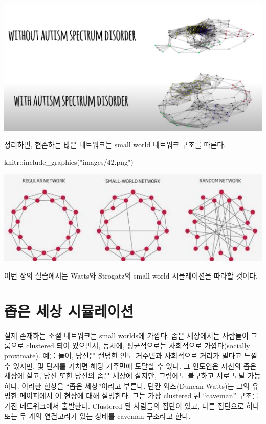 \documentclass[
]{book}
\newenvironment{Shaded}{\begin{snugshade}}{\end{snugshade}}
\newcommand{\FunctionTok}[1]{\textcolor[rgb]{0.00,0.00,0.00}{#1}}
\newcommand{\NormalTok}[1]{#1}
\newcommand{\SpecialCharTok}[1]{\textcolor[rgb]{0.00,0.00,0.00}{#1}}
\newcommand{\StringTok}[1]{\textcolor[rgb]{0.31,0.60,0.02}{#1}}
\begin{document}
\begin{center}\includegraphics[width=0.8\linewidth]{images/44} \end{center}

정리하면, 현존하는 많은 네트워크는 small world 네트워크 구조를 따른다.

\begin{Shaded}
\begin{Highlighting}[]
\NormalTok{knitr}\SpecialCharTok{::}\FunctionTok{include\_graphics}\NormalTok{(}\StringTok{"images/42.png"}\NormalTok{)}
\end{Highlighting}
\end{Shaded}

\begin{center}\includegraphics[width=0.8\linewidth]{images/42} \end{center}

이번 장의 실습에서는 Watts와 Strogatz의 small world 시뮬레이션을 따라할 것이다.

\hypertarget{uxc881uxc740-uxc138uxc0c1-uxc2dcuxbbacuxb808uxc774uxc158}{%
\section{좁은 세상 시뮬레이션}\label{uxc881uxc740-uxc138uxc0c1-uxc2dcuxbbacuxb808uxc774uxc158}}

실제 존재하는 소셜 네트워크는 small worlds에 가깝다. 좁은 세상에서는 사람들이 그룹으로 clustered 되어 있으면서, 동시에, 평균적으로는 사회적으로 가깝다(socially proximate). 예를 들어, 당신은 랜덤한 인도 거주민과 사회적으로 거리가 멀다고 느낄 수 있지만, 몇 단계를 거치면 해당 거주민에 도달할 수 있다. 그 인도인은 자신의 좁은 세상에 살고, 당신 또한 당신의 좁은 세상에 살지만, 그럼에도 불구하고 서로 도달 가능하다. 이러한 현상을 ``좁은 세상''이라고 부른다.
던칸 와츠(Duncan Watts)는 그의 유명한 페이퍼에서 이 현상에 대해 설명한다. 그는 가장 clustered 된 ``caveman'' 구조를 가진 네트워크에서 출발한다. Clustered 된 사람들의 집단이 있고, 다른 집단으로 하나 또는 두 개의 연결고리가 있는 상태를 caveman 구조라고 한다.
\end{document}
